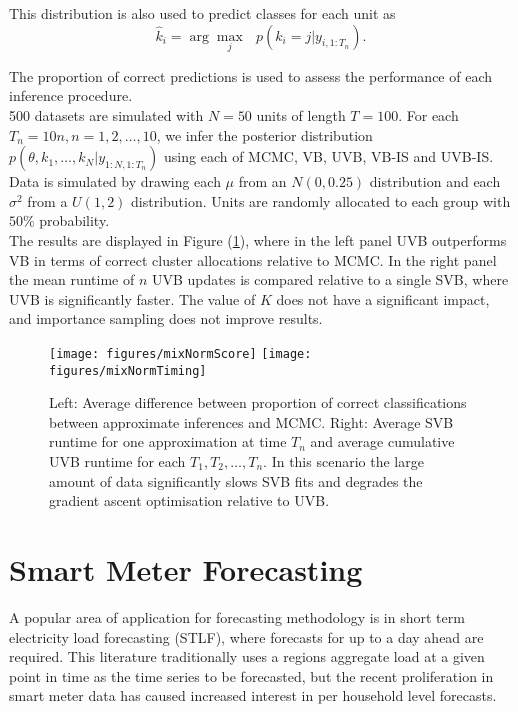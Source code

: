 \documentclass[12pt,a4paper]{article}\usepackage[]{graphicx}\usepackage[]{color}
\begin{document}
This distribution is also used to predict classes for each unit as
\begin{equation}
\hat{k}_i = \arg \underset{j}{\max}\mbox{ } p(k_i = j | y_{i, 1:T_n}).
\end{equation}

The proportion of correct predictions is used to assess the performance of each inference procedure.
\\

500 datasets are simulated with $N = 50$ units of length $T = 100$. For each $T_n = 10n, n = 1, 2, \ldots, 10$, we infer the posterior distribution $p(\theta, k_1, \ldots, k_N | y_{1:N, 1:T_n})$ using each of MCMC, VB, UVB, VB-IS and UVB-IS. Data is simulated by drawing each $\mu$ from an $N(0, 0.25)$ distribution and each $\sigma^2$ from a $U(1, 2)$ distribution. Units are randomly allocated to each group with $50\%$ probability. 
\\

The results are displayed in Figure (\ref{fig:UVBMMCResults}), where in the left panel UVB outperforms VB in terms of correct cluster allocations relative to MCMC. In the right panel the mean runtime of $n$ UVB updates is compared relative to a single SVB, where UVB is significantly faster. The value of $K$ does not have a significant impact, and importance sampling does not improve results.

\begin{figure}%
    \centering
    {{\texttt{[image: figures/mixNormScore]} }}%
    \qquad
    {{\texttt{[image: figures/mixNormTiming]} }}%
    \caption{Left: Average difference between proportion of correct classifications between approximate inferences and MCMC. Right: Average SVB runtime for one approximation at time $T_n$ and average cumulative UVB runtime for each $T_1, T_2, \ldots, T_n$. In this scenario the large amount of data significantly slows SVB fits and degrades the gradient ascent optimisation relative to UVB.}%
    \label{fig:UVBMMCResults}%
\end{figure}


\section{Smart Meter Forecasting}

A popular area of application for forecasting methodology is in short term electricity load forecasting (STLF), where forecasts for up to a day ahead are required. This literature traditionally uses a regions aggregate load at a given point in time as the time series to be forecasted, but the recent proliferation in smart meter data has caused increased interest in per household level forecasts. 
\\
\end{document}
